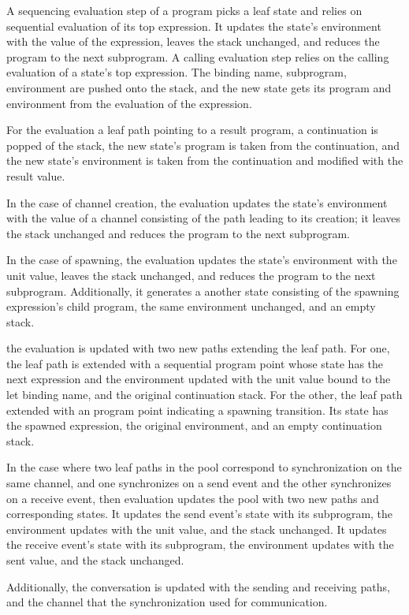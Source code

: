 \documentclass{article}
\begin{document}
A sequencing evaluation step of a program picks a leaf state and relies on
sequential evaluation of its top expression. It updates the state's environment with the
value of the expression, leaves the stack unchanged, and reduces the program to the next
subprogram. A calling evaluation step relies on the calling evaluation of a state's top
expression. The binding name, subprogram, environment are pushed onto the stack, and the new
state gets its program and environment from the evaluation of the expression. 

For the evaluation a leaf path pointing to a result program, a continuation is popped of the
stack, the new state's program is taken from the continuation, and the new state's environment
is taken from the continuation and modified with the result value.

In the case of channel creation, the evaluation updates the state's environment with the
value of a channel consisting of the path leading to its creation; it leaves the stack
unchanged and reduces the program to the next subprogram.

In the case of spawning, the evaluation updates the state's environment with the
unit value, leaves the stack unchanged, and reduces the program to the next subprogram.
Additionally, it generates a another state consisting of the spawning expression's child
program, the same environment unchanged, and an empty stack.

the evaluation is updated with two
new paths extending the leaf path.  For one, the leaf path is extended with a sequential
program point whose state has the next expression and the environment updated
with the unit value bound to
the let binding name, and the original continuation stack. For the other, the leaf path
extended with an program point indicating a spawning transition.  Its state has the spawned
expression, the original environment, and an empty continuation stack. 

In the case where two leaf paths in the pool correspond to synchronization on the same channel,
and one synchronizes on a send event and the other synchronizes on a receive event, then
evaluation updates the pool with two new paths and corresponding states.
It updates the send event's state with its subprogram, the environment updates with the unit
value, and the stack unchanged.  It updates the receive event's state with its subprogram, the
environment updates with the sent value, and the stack unchanged.

Additionally, the conversation is updated with the sending and receiving paths, and the channel
that the synchronization used for communication. 
\end{document}
